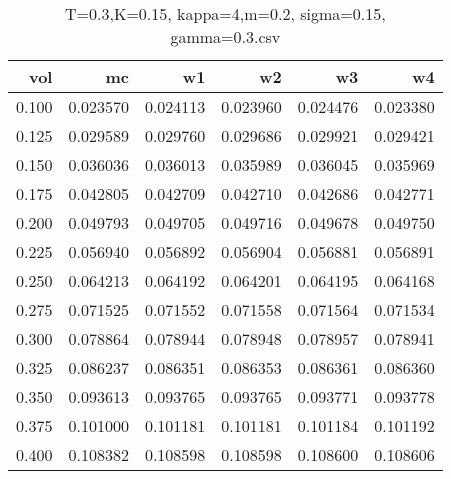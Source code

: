 \begin{table}
    \centering
    \caption{T=0.3,K=0.15, kappa=4,m=0.2, sigma=0.15, gamma=0.3.csv}
    \begin{tabular}{rrrrrr}
    \toprule
      vol &       mc &       w1 &       w2 &       w3 &       w4 \\
    \midrule
    0.100 & 0.023570 & 0.024113 & 0.023960 & 0.024476 & 0.023380 \\
    0.125 & 0.029589 & 0.029760 & 0.029686 & 0.029921 & 0.029421 \\
    0.150 & 0.036036 & 0.036013 & 0.035989 & 0.036045 & 0.035969 \\
    0.175 & 0.042805 & 0.042709 & 0.042710 & 0.042686 & 0.042771 \\
    0.200 & 0.049793 & 0.049705 & 0.049716 & 0.049678 & 0.049750 \\
    0.225 & 0.056940 & 0.056892 & 0.056904 & 0.056881 & 0.056891 \\
    0.250 & 0.064213 & 0.064192 & 0.064201 & 0.064195 & 0.064168 \\
    0.275 & 0.071525 & 0.071552 & 0.071558 & 0.071564 & 0.071534 \\
    0.300 & 0.078864 & 0.078944 & 0.078948 & 0.078957 & 0.078941 \\
    0.325 & 0.086237 & 0.086351 & 0.086353 & 0.086361 & 0.086360 \\
    0.350 & 0.093613 & 0.093765 & 0.093765 & 0.093771 & 0.093778 \\
    0.375 & 0.101000 & 0.101181 & 0.101181 & 0.101184 & 0.101192 \\
    0.400 & 0.108382 & 0.108598 & 0.108598 & 0.108600 & 0.108606 \\
    \bottomrule
    \end{tabular}
    \end{table}